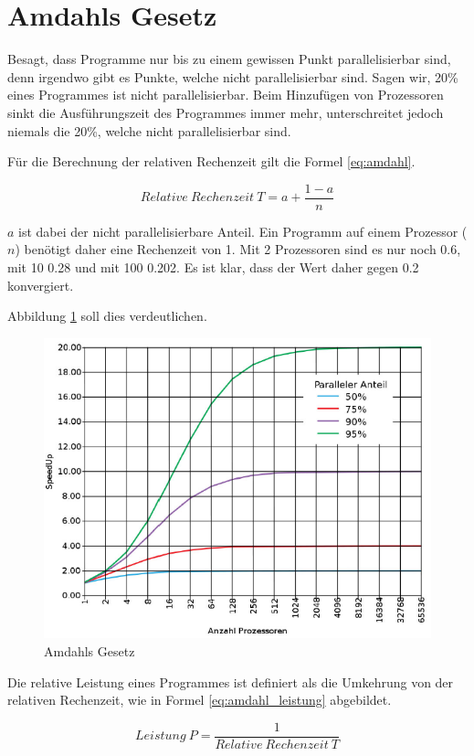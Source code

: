 \section{Amdahls Gesetz}
Besagt, dass Programme nur bis zu einem gewissen Punkt parallelisierbar sind, denn irgendwo gibt es Punkte, welche nicht parallelisierbar sind. Sagen wir, 20\% eines Programmes ist nicht parallelisierbar. Beim Hinzufügen von Prozessoren sinkt die Ausführungszeit des Programmes immer mehr, unterschreitet jedoch niemals die 20\%, welche nicht parallelisierbar sind. 

Für die Berechnung der relativen Rechenzeit gilt die Formel \ref{eq:amdahl}.

\begin{equation}\label{eq:amdahl}
Relative\ Rechenzeit\ T = a + \frac{1-a}{n}
\end{equation}

$ a $ ist dabei der nicht parallelisierbare Anteil. Ein Programm auf einem Prozessor ($ n $) benötigt daher eine Rechenzeit von 1. Mit 2 Prozessoren sind es nur noch 0.6, mit 10 0.28 und mit 100 0.202. Es ist klar, dass der Wert daher gegen 0.2 konvergiert.

Abbildung \ref{fig:amdahl} soll dies verdeutlichen.
\begin{figure}
\centering
\includegraphics[width=0.7\linewidth]{fig/amdahl}
\caption{Amdahls Gesetz}
\label{fig:amdahl}
\end{figure}

Die relative Leistung eines Programmes ist definiert als die Umkehrung von der relativen Rechenzeit, wie in Formel \ref{eq:amdahl_leistung} abgebildet.

\begin{equation}\label{eq:amdahl_leistung}
	Leistung\ P = \frac{1}{Relative\ Rechenzeit\ T }
\end{equation}

